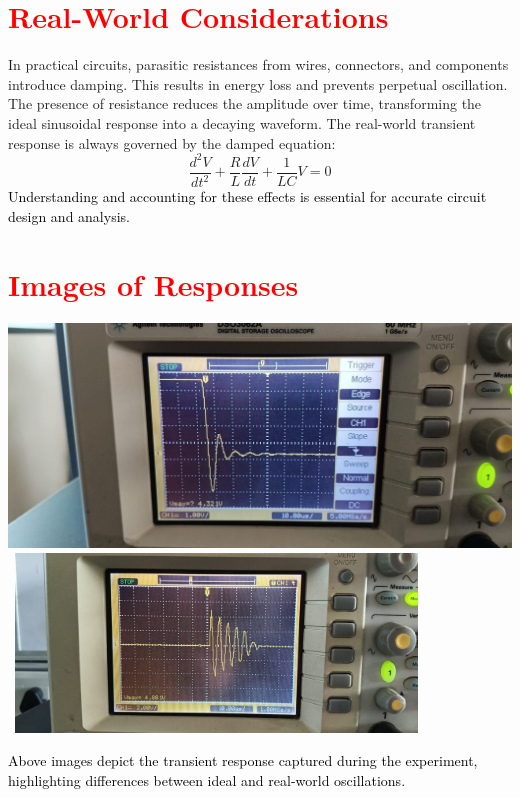 \documentclass[a4paper,12pt]{article}
\begin{document}
\section{\textcolor{red}{Real-World Considerations}}
\begin{tcolorbox}[colframe=black!70!black,colback=gray!10!white]
In practical circuits, parasitic resistances from wires, connectors, and components introduce damping. This results in energy loss and prevents perpetual oscillation. The presence of resistance reduces the amplitude over time, transforming the ideal sinusoidal response into a decaying waveform. The real-world transient response is always governed by the damped equation:
\begin{equation}
\frac{d^2V}{dt^2} + \frac{R}{L} \frac{dV}{dt} + \frac{1}{LC} V = 0
\end{equation}
\textcolor{black}{Understanding and accounting for these effects is essential for accurate circuit design and analysis.}
\end{tcolorbox}

\section{\textcolor{red}{Images of Responses}}
\begin{tcolorbox}[breakable , colframe=black!70!black,colback=gray!10!white,title=\textbf{\textcolor{black}{Oscilloscope Waveforms and Circuit Images}}]
\begin{center}
\includegraphics[width=1.0\textwidth]{fig/response_image1.jpg} \
\includegraphics[width=0.8\textwidth]{fig/response_image2.jpg}
\end{center}
\textcolor{black}{Above images depict the transient response captured during the experiment, highlighting differences between ideal and real-world oscillations.}
\end{tcolorbox}
\end{document}
